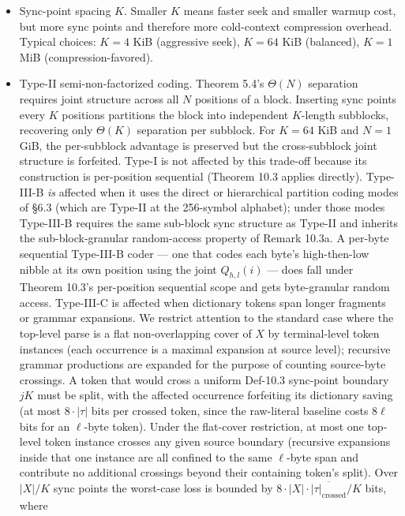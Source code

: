 \documentclass[
]{article}
\begin{document}
\begin{itemize}
\item
  Sync-point spacing $K$. Smaller $K$ means faster seek and smaller
  warmup cost, but more sync points and therefore more cold-context
  compression overhead. Typical choices: $K = 4$ KiB (aggressive
  seek), $K = 64$ KiB (balanced), $K = 1$ MiB (compression-favored).
\item
  Type-II semi-non-factorized coding. Theorem 5.4's $\Theta(N)$
  separation requires joint structure across all $N$ positions of a
  block. Inserting sync points every $K$ positions partitions the
  block into independent $K$-length subblocks, recovering only
  $\Theta(K)$ separation per subblock. For $K = 64$ KiB and $N = 1$
  GiB, the per-subblock advantage is preserved but the cross-subblock
  joint structure is forfeited. Type-I is not affected by this
  trade-off because its construction is per-position sequential
  (Theorem 10.3 applies directly). Type-III-B \emph{is} affected
  when it uses the direct or hierarchical partition coding modes of
  §6.3 (which are Type-II at the 256-symbol alphabet); under those
  modes Type-III-B requires the same sub-block sync structure as
  Type-II and inherits the sub-block-granular random-access
  property of Remark 10.3a. A per-byte sequential Type-III-B coder
  --- one that codes each byte's high-then-low nibble at its own
  position using the joint $Q_{h,l}(i)$ --- does fall under Theorem
  10.3's per-position sequential scope and gets byte-granular
  random access. Type-III-C
  is affected when dictionary tokens span longer fragments or
  grammar expansions. We restrict attention to the standard case
  where the top-level parse is a flat non-overlapping cover of $X$
  by terminal-level token instances (each occurrence is a maximal
  expansion at source level); recursive grammar productions are
  expanded for the purpose of counting source-byte crossings. A
  token that would cross a uniform Def-10.3 sync-point boundary
  $jK$ must be split, with the affected occurrence forfeiting its
  dictionary saving (at most $8 \cdot |\tau|$ bits per crossed
  token, since the raw-literal baseline costs $8\ell$ bits for an
  $\ell$-byte token). Under the flat-cover restriction, at most one
  top-level token instance crosses any given source boundary
  (recursive expansions inside that one instance are all confined to
  the same $\ell$-byte span and contribute no additional crossings
  beyond their containing token's split). Over $|X|/K$ sync points
  the worst-case loss is bounded by $8 \cdot |X| \cdot
  \overline{|\tau|_{\text{crossed}}} / K$ bits, where

\end{itemize}
\end{document}
